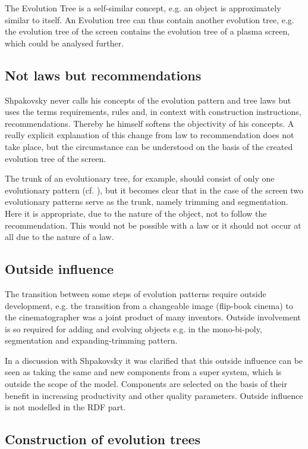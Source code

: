 \documentclass[11pt,a4paper]{article}
\begin{document}
The Evolution Tree is a self-similar concept, e.g. an object is approximately
similar to itself. An Evolution tree can thus contain another evolution tree,
e.g. the evolution tree of the screen contains the evolution tree of a plasma
screen, which could be analysed further.

\subsection{Not laws but recommendations}

Shpakovsky never calls his concepts of the evolution pattern and tree laws but
uses the terms requirements, rules and, in context with construction
instructions, recommendations. Thereby he himself softens the objectivity of
his concepts. A really explicit explanation of this change from law to
recommendation does not take place, but the circumstance can be understood on
the basis of the created evolution tree of the screen.

The trunk of an evolutionary tree, for example, should consist of only one
evolutionary pattern (cf. \cite[p. 122f]{Shpakovsky2016}), but it becomes
clear that in the case of the screen two evolutionary patterns serve as the
trunk, namely trimming and segmentation. Here it is appropriate, due to the
nature of the object, not to follow the recommendation. This would not be
possible with a law or it should not occur at all due to the nature of a law.

\subsection{Outside influence}

The transition between some steps of evolution patterns require outside
development, e.g. the transition from a changeable image (flip-book cinema) to
the cinematographer was a joint product of many inventors. Outside involvement
is so required for adding and evolving objects e.g. in the mono-bi-poly,
segmentation and expanding-trimming pattern.

In a discussion with Shpakovsky it was clarified that this outside influence
can be seen as taking the same and new components from a super system, which
is outside the scope of the model. Components are selected on the basis of
their benefit in increasing productivity and other quality parameters. Outside
influence is not modelled in the RDF part.

\subsection{Construction of evolution trees}
\end{document}

